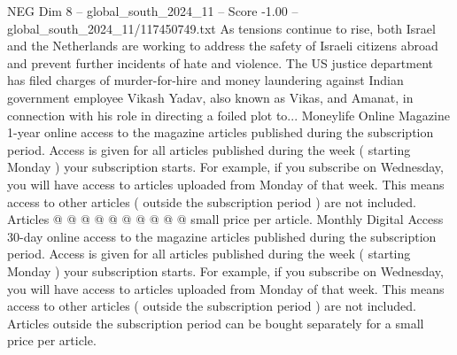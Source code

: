 \begin{textsample}{NEG Dim 8 – global\_south\_2024\_11 – Score -1.00 – global\_south\_2024\_11/117450749.txt}
As tensions continue to rise, both Israel and the Netherlands are working to address the safety of Israeli citizens abroad and prevent further incidents of hate and violence.
The US justice department has filed charges of murder-for-hire and money laundering against Indian government employee Vikash Yadav, also known as Vikas, and Amanat, in connection with his role in directing a foiled plot to...
Moneylife Online Magazine 1-year online access to the magazine articles published during the subscription period.
Access is given for all articles published during the week ( starting Monday ) your subscription starts.
For example, if you subscribe on Wednesday, you will have access to articles uploaded from Monday of that week.
This means access to other articles ( outside the subscription period ) are not included.
Articles @ @ @ @ @ @ @ @ @ @ small price per article.
Monthly Digital Access 30-day online access to the magazine articles published during the subscription period.
Access is given for all articles published during the week ( starting Monday ) your subscription starts.
For example, if you subscribe on Wednesday, you will have access to articles uploaded from Monday of that week.
This means access to other articles ( outside the subscription period ) are not included.
Articles outside the subscription period can be bought separately for a small price per article.

\end{textsample}
